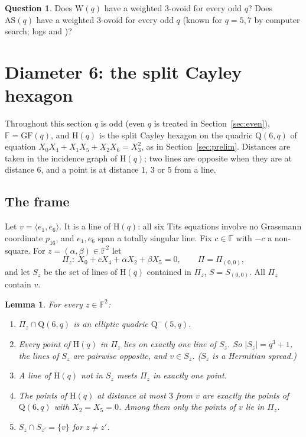 \documentclass[11pt]{amsart}
\newtheorem{lemma}[theorem]{Lemma}
\theoremstyle{definition}
\newtheorem{question}[theorem]{Question}
\theoremstyle{remark}
\newcommand{\GF}{\mathrm{GF}}
\newcommand{\F}{\mathbb{F}}
\newcommand{\Hq}{\mathrm{H}}
\newcommand{\AS}{\mathrm{AS}}
\newcommand{\Wq}{\mathrm{W}}
\newcommand{\Qf}{\mathrm{Q}}
\begin{document}
\begin{question}
Does $\Wq(q)$ have a weighted $3$-ovoid for every odd $q$? Does $\AS(q)$ have a weighted $3$-ovoid for every odd $q$ (known for $q=5,7$ by computer search; logs  and )?
\end{question}

\section{Diameter 6: the split Cayley hexagon}\label{sec:d6}

Throughout this section $q$ is odd (even $q$ is treated in Section~\ref{sec:even}), $\F=\GF(q)$, and $\Hq(q)$ is the split Cayley hexagon on the quadric $\Qf(6,q)$ of equation $X_0X_4+X_1X_5+X_2X_6=X_3^2$, as in Section~\ref{sec:prelim}. Distances are taken in the incidence graph of $\Hq(q)$; two lines are opposite when they are at distance $6$, and a point is at distance $1$, $3$ or $5$ from a line.

\subsection{The frame}
Let $v=\langle e_1,e_6\rangle$. It is a line of $\Hq(q)$: all six Tits equations involve no Grassmann coordinate $p_{16}$, and $e_1,e_6$ span a totally singular line. Fix $c\in\F$ with $-c$ a non-square. For $z=(\alpha,\beta)\in\F^2$ let
\[
\Pi_z\colon\ X_0+cX_4+\alpha X_2+\beta X_5=0,\qquad \Pi=\Pi_{(0,0)},
\]
and let $S_z$ be the set of lines of $\Hq(q)$ contained in $\Pi_z$, $S=S_{(0,0)}$. All $\Pi_z$ contain $v$.

\begin{lemma}\label{lem:herm}
For every $z\in\F^2$:
\begin{enumerate}[label=\textup{(\alph*)}]
\item $\Pi_z\cap\Qf(6,q)$ is an elliptic quadric $\Qf^-(5,q)$.
\item Every point of $\Hq(q)$ in $\Pi_z$ lies on exactly one line of $S_z$. So $|S_z|=q^3+1$, the lines of $S_z$ are pairwise opposite, and $v\in S_z$. \textup{(}$S_z$ is a Hermitian spread.\textup{)}
\item A line of $\Hq(q)$ not in $S_z$ meets $\Pi_z$ in exactly one point.
\item The points of $\Hq(q)$ at distance at most $3$ from $v$ are exactly the points of $\Qf(6,q)$ with $X_2=X_5=0$. Among them only the points of $v$ lie in $\Pi_z$.
\item $S_z\cap S_{z'}=\{v\}$ for $z\ne z'$.
\end{enumerate}
\end{lemma}
\end{document}
